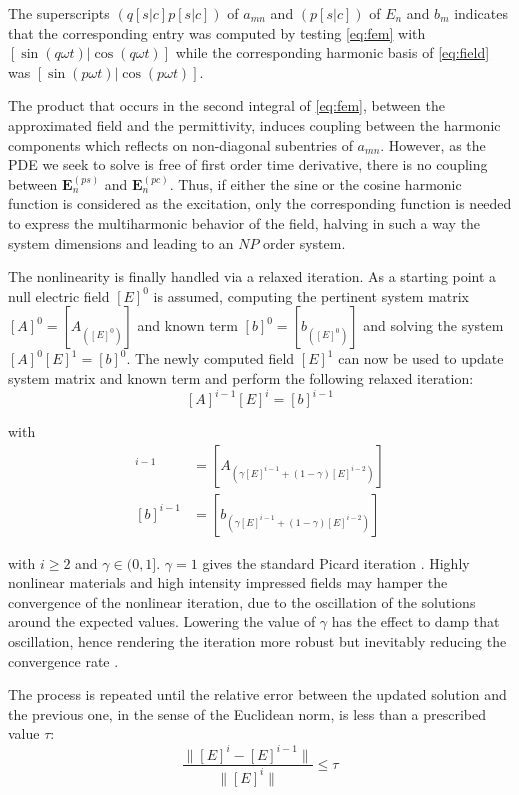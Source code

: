 \documentclass[journal]{IEEEtran}
\renewcommand{\vec}[1]{\mathbf{#1}}
\begin{document}
\noindent The superscripts $(q[s|c]p[s|c])$ of $a_{mn}$ and
$(p[s|c])$ of $E_n$ and $b_m$ indicates that the corresponding
entry was computed by testing \eqref{eq:fem} with $[\sin(q \omega t) | \cos(q \omega t)]$ 
while the corresponding harmonic basis of \eqref{eq:field}
was $[\sin(p \omega t) | \cos(p \omega t)]$.

The product that occurs in the second integral of \eqref{eq:fem}, between the
approximated field and the permittivity, induces coupling between the harmonic
components which reflects on non-diagonal subentries of $a_{mn}$. 
However, as the PDE we seek to solve is free of first order time derivative, there is no 
coupling between $\vec{E}_{n}^{(ps)}$ and $\vec{E}_{n}^{(pc)}$. Thus, if either the 
sine or the cosine harmonic function is considered as the excitation, only the corresponding
function is needed to express the multiharmonic behavior of the 
field, halving in such a way the system dimensions and leading to an $NP$ order
system.

The nonlinearity is finally handled via a
relaxed iteration. As a starting point a null electric field $[E]^0$ is assumed,
computing the pertinent system matrix $[A]^0=[A_{([E]^0)}]$ and
known term $[b]^0=[b_{([E]^0)}]$ and solving the system $[A]^0 [E]^1 =
[b]^0$. The newly computed field $[E]^1$ can now be used to update system
matrix and known term and perform the following relaxed iteration:
%
\begin{equation} \label{eq:lastLinearSystem}
[A]^{i-1} [E]^{i} = [b]^{i-1}
\end{equation}

\noindent with 
%
\begin{align}
[A]^{i-1} &= [A_{(\gamma [E]^{i-1} + (1-\gamma) [E]^{i-2})}] \\
[b]^{i-1} &= [b_{(\gamma [E]^{i-1} + (1-\gamma) [E]^{i-2})}]
\end{align}

\noindent with $i \geq 2$ and
$\gamma\in(0,1]$. $\gamma=1$ gives the standard Picard iteration \cite{Guarnieri2010}. 
Highly nonlinear materials and high intensity impressed fields may hamper the convergence
 of the nonlinear iteration, due to
the oscillation of the solutions around the expected values. Lowering the value
of $\gamma$ has the effect to damp that oscillation, hence rendering the
iteration more robust but inevitably reducing the convergence rate \cite{Silvester1997}.

The process is repeated until the relative error between the updated solution
and the previous one, in the sense of the Euclidean norm, is less than a
prescribed value $\tau$:
%
\begin{equation}
\frac{\|[E]^{i} - [E]^{i-1} \|}{\| [E]^{i} \|} \leq \tau
\end{equation}
\end{document}
